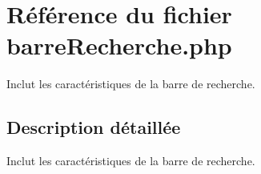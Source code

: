 \hypertarget{barreRecherche_8php}{}\section{Référence du fichier barre\+Recherche.\+php}
\label{barreRecherche_8php}


Inclut les caractéristiques de la barre de recherche.  




\subsection{Description détaillée}
Inclut les caractéristiques de la barre de recherche. 

